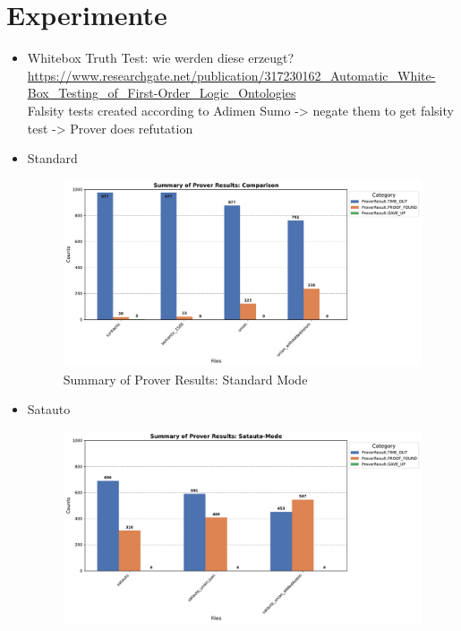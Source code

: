 \documentclass[german,version-2020-11]{uzl-thesis}
\begin{document}
\chapter{Experimente}
  \begin{itemize}
    \item Whitebox Truth Test: wie werden diese erzeugt? \\ 
    \url{https://www.researchgate.net/publication/317230162_Automatic_White-Box_Testing_of_First-Order_Logic_Ontologies} \\ 
    Falsity tests created according to Adimen Sumo -> negate them to get falsity test -> Prover does refutation
    \clearpage
    \item Standard
    \begin{figure}[h!]
      \centering
      \includegraphics[width=\textwidth]{standard_mode_output.pdf} %
      \caption{Summary of Prover Results: Standard Mode}
      \label{fig:prover_results_standard}
    \end{figure}
    \clearpage
    \item Satauto
    \begin{figure}[h!]
      \centering
      \includegraphics[width=\textwidth]{satauto_mode_output.pdf} %

\end{figure}
\end{itemize}
\end{document}
